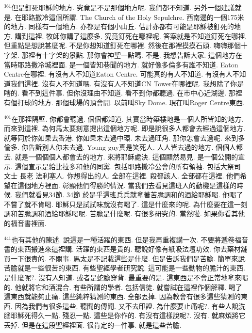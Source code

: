 \documentclass{book}
\begin{document}
$^{361}$但是釘死耶穌的地方.
究竟是不是那個地方呢.
我們都不知道.
另外一個建議就是.
在耶路撒冷這個所謂.
The Church of the Holy Sepulchre.
西南邊的一個175米的地方.
同樣有一個地方.
亦都是有個小山丘.
估計亦都有可能是耶穌被釘死的地方.
講到這裡.
牧師你講了這麼多.
究竟釘死在哪裡呢.
答案就是不知道釘死在哪裡.
但重點是想說甚麼呢.
不是你想知道釘死在哪裡.
然後在那裡摸摸石頭.
嗨嗨那個十字架.
那裡有十字架的景點.
那你會神聖一點嗎.
不是.
我想告訴大家.
這個地方在當時耶路撒冷城裡面.
是一個皆知巷聞的地方.
就好像多倫多有誰不知道.
Eaton Centre在哪裡.
有沒有人不知道Eaton Centre.
可能真的有人不知道.
有沒有人不知道我們這裡.
沒有人不知道嗎.
有沒有人不知道CN Tower在哪裡呢.
我想除了你是瞎的.
看不到這件事.
但你沒理由不知道.
看不到你都聽過.
在市中心近湖邊.
那裡有個打球的地方.
那個球場的頂會開.
以前叫Sky Dome.
現在叫Roger Centre東西.

$^{401}$在那裡隔壁.
你都會聽過.
個個都知道.
其實當時築樓地是一個人所皆知的地方.
而來到這裡.
為何馬太要刻意提出這個地方呢.
即是說很多人都會去經過這個地方.
就等同於你如果去香港.
你如果未去過中環.
未去過旺角.
那你怎會去過呢.
來到多倫多.
你告訴別人你未去過.
Young guy真是笑死人.
人人皆去過的地方.
個個人都去.
就是一個個個人都會去的地方.
來將耶穌處決.
這個顯然易見.
是一個公開的宣示.
這個宣示是給比拉多和他的同黨.
包括耶路撒冷公會的所有領袖.
包括大祭司 文士 長老 法利塞人.
你想得出的人.
全部在這裡.
殺都該人.
全部都在這裡.
他們希望在這個地方裡面.
彰顯他們得勝的情況.
當我們去看見這班人的動機是這樣的時候.
我們就看見34節.
34節 於是乎這班兵兵就拿著苦膽調和的酒給耶穌喝.
他喝了不嘗了就不肯喝.
耶穌只是試試味就沒有喝了.
這是什麼來的呢.
為什麼要在這一刻調和苦膽調和酒給耶穌喝呢.
苦膽是什麼呢.
有很多研究的.
當然啦.
如果你看其他的福音書裡面.

$^{441}$也有其他的陳述.
說這是一種活躍的東西.
但是我再重複講一次.
不要將遞卷福音書的東西搬進來這裡講.
活躍的東西是貴的.
聽說好像有紙吸法壇功效.
你去藥材舖買一下很貴的.
不關事.
馬太是不記載這些是什麼.
但是告訴我們是苦膽.
簡單來說.
苦膽就是一些很苦的東西.
有些聖經學者研究說.
這可能是一些動物的膽汁的東西.
是什麼呢?.
沒有人知道.
或者是蛇膽穿背.
最重要的是.
這東西是不會正常地拿來喝的.
他就將它和酒混合.
有些所謂的學者.
包括信徒.
就嘗試在這裡作個解釋.
喝了這東西就能夠止痛.
這些純粹猜測的東西.
全部丟掉.
因為教會有很多這些猜測的東西.
因為我們有很多這些.
聽聞的傳聞.
又不去印證.
為什麼要止痛呢?.
有些人說洗腦耶穌死得久一點.
殘忍一點.
這些是你作的.
有沒有這樣說呢?.
沒有.
就麻煩將它丟掉.
但是在這段聖經裡面.
很肯定的一件事.
就是這些苦膽.
\end{document}
